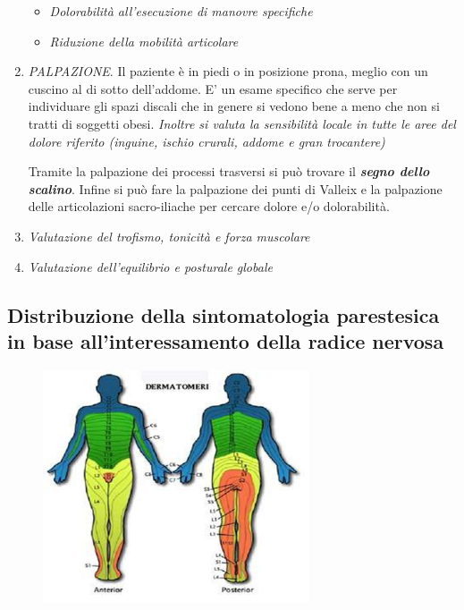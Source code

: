 \begin{enumerate}
\begin{itemize}
\item
  \emph{Dolorabilità all'esecuzione di manovre specifiche}
\item
  \emph{Riduzione della mobilità articolare}
\end{itemize}


\item
  \emph{PALPAZIONE}. Il paziente è in piedi o in posizione prona, meglio
  con un cuscino al di sotto dell'addome. E' un esame specifico che
  serve per individuare gli spazi discali che in genere si vedono bene a
  meno che non si tratti di soggetti obesi. \emph{Inoltre si valuta la
  sensibilità locale in tutte le aree del dolore riferito (inguine,
  ischio crurali, addome e gran trocantere)}

Tramite la palpazione dei processi trasversi si può trovare il
\textbf{\emph{segno dello scalino}}. Infine si può fare la palpazione
dei punti di Valleix e la palpazione delle articolazioni sacro-iliache
per cercare dolore e/o dolorabilità.

\item
  \emph{Valutazione del \emph{trofismo, tonicità e forza muscolare}}
\item
  \emph{Valutazione dell'\emph{equilibrio} e \emph{posturale globale}}
\end{enumerate}

\subsection{Distribuzione della sintomatologia parestesica in base all'interessamento della radice nervosa}


\begin{figure}[!ht]
\centering
	\includegraphics[width=0.7\textwidth]{029/image1.png}
\end{figure}

